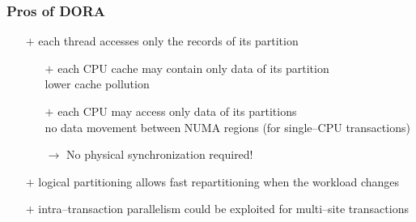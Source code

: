\begin{frame}
	\frametitle{Pros of DORA}
	
	\begin{itemize}
		\item[$+$]	each thread accesses only the records of its partition
			\begin{itemize}
				\item[$+$]	each CPU cache may contain only data of its partition \\ \bm{$\rightarrow$} lower cache pollution
				\item[$+$]	each CPU may access only data of its partitions \\ \bm{$\rightarrow$} no data movement between NUMA regions (for single--CPU transactions)
				\item[$\rightarrow$]	No physical synchronization required!
			\end{itemize}
		\item[$+$]	logical partitioning allows fast repartitioning when the workload changes
		\item[$+$]	intra--transaction parallelism could be exploited for multi--site transactions
	\end{itemize}
	

\end{frame}
